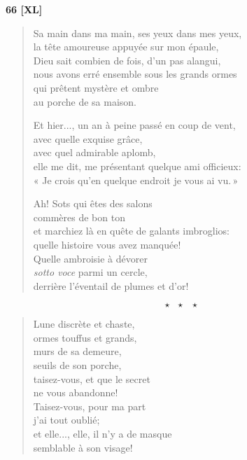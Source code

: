 
\begin{center}
  \textbf{66 [XL]}
\end{center}

\begin{verse}
  Sa main dans ma main,
  ses yeux dans mes yeux,\\
  la tête amoureuse
  appuyée sur mon épaule, \\
  Dieu sait combien de fois,
  d'un pas alangui, \\
  nous avons erré ensemble
  sous les grands ormes\hspace*{-10pt} \\
  qui prêtent mystère et ombre \\
  au porche de sa maison.

  Et hier..., un an à peine
  passé en coup de vent, \\
  avec quelle exquise grâce, \\
  avec quel admirable aplomb, \\
  elle me dit, me présentant
  quelque ami officieux:\hspace*{-10pt}\\
  « Je crois qu'en quelque endroit
  je vous ai vu.\,»

  Ah! Sots qui êtes des salons \\
  commères de bon ton \\
  et marchiez là en quête
  de galants imbroglios: \\
  quelle histoire vous avez manquée! \\
  Quelle ambroisie à dévorer \\
  \emph{sotto voce} parmi un cercle, \\
  derrière l'éventail de plumes et d'or!
\end{verse}

\[\star \ \ \ \star \ \ \ \star\]

\begin{verse}
  Lune discrète et chaste, \\
  ormes touffus et grands, \\
  murs de sa demeure, \\
  seuils de son porche, \\
  taisez-vous, et que le secret \\
  ne vous abandonne! \\
  Taisez-vous, pour ma part \\
  j'ai tout oublié; \\
  et elle..., elle, il n'y a de masque \\
  semblable à son visage!
\end{verse}

